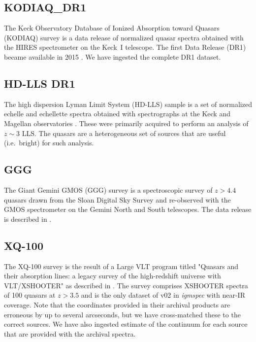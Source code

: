 \documentclass[12pt]{elsarticle}
\begin{document}
\subsection{KODIAQ\_DR1}
\label{sec:kodiaq}

The Keck Observatory Database of Ionized Absorption toward 
Quasars (KODIAQ) survey is a data release of normalized
quasar spectra obtained with the HIRES spectrometer 
\citep{vogt94} on the Keck~I telescope. 
The first Data Release (DR1) became available in 2015 
\cite{kodiaq_dr1}. 
We have ingested the complete DR1 dataset.

\subsection{HD-LLS DR1}
\label{sec:hdlls}

The high dispersion Lyman Limit System (HD-LLS) sample is a set of 
normalized echelle and echellette spectra obtained with spectrographs
at the Keck and Magellan observatories \cite{prochaska+15}.  
These were primarily acquired
to perform an analysis of $z \sim 3$ LLS. 
The quasars are a heterogeneous set of sources that
are useful  (i.e.\ bright) for such analysis. 

\subsection{GGG}
\label{sec:ggg}

The Giant Gemini GMOS (GGG) survey is a spectroscopic survey of 
$z>4.4$ quasars drawn from the Sloan Digital Sky Survey and re-observed with the GMOS spectrometer on the Gemini North and South telescopes. 
The data release is described in \cite{worseck+14}.

\subsection{XQ-100}
\label{sec:xq100}

The XQ-100 survey is the result of a Large VLT program
titled "Quasars and their absorption lines: 
a legacy survey of the high-redshift universe with VLT/XSHOOTER" 
as described in \cite{xq100}.
The survey comprises XSHOOTER spectra of 100 quasars 
at $z>3.5$ and is the only dataset of v02 in {\it igmspec}
with near-IR coverage.
Note that the coordinates provided in their archival products
are erroneous by up to several arcseconds, 
but we have cross-matched these to the correct sources.
We have also ingested estimate of the continuum for each
source that are provided with the archival spectra.
\end{document}
